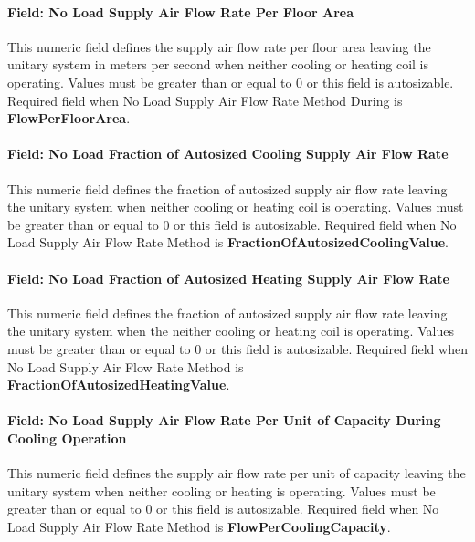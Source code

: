 \paragraph{Field: No Load Supply Air Flow Rate Per Floor Area}\label{field-no-load-supply-air-flow-rate-per-floor-area}

This numeric field defines the supply air flow rate per floor area leaving the unitary system in meters per second when neither cooling or heating coil is operating. Values must be greater than or equal to 0 or this field is autosizable. Required field when No Load Supply Air Flow Rate Method During is \textbf{FlowPerFloorArea}.

\paragraph{Field: No Load Fraction of Autosized Cooling Supply Air Flow Rate}\label{field-no-load-fraction-of-autosized-cooling-supply-air-flow-rate}

This numeric field defines the fraction of autosized supply air flow rate leaving the unitary system when neither cooling or heating coil is operating. Values must be greater than or equal to 0 or this field is autosizable. Required field when No Load Supply Air Flow Rate Method is \textbf{FractionOfAutosizedCoolingValue}.

\paragraph{Field: No Load Fraction of Autosized Heating Supply Air Flow Rate}\label{field-no-load-fraction-of-autosized-heating-supply-air-flow-rate}

This numeric field defines the fraction of autosized supply air flow rate leaving the unitary system when the neither cooling or heating coil is operating. Values must be greater than or equal to 0 or this field is autosizable. Required field when No Load Supply Air Flow Rate Method is \textbf{FractionOfAutosizedHeatingValue}.

\paragraph{Field: No Load Supply Air Flow Rate Per Unit of Capacity During Cooling Operation}\label{field-no-load-supply-air-flow-rate-per-unit-of-capacity-during-cooling-operation}

This numeric field defines the supply air flow rate per unit of capacity leaving the unitary system when neither cooling or heating is operating. Values must be greater than or equal to 0 or this field is autosizable. Required field when No Load Supply Air Flow Rate Method is \textbf{FlowPerCoolingCapacity}.

